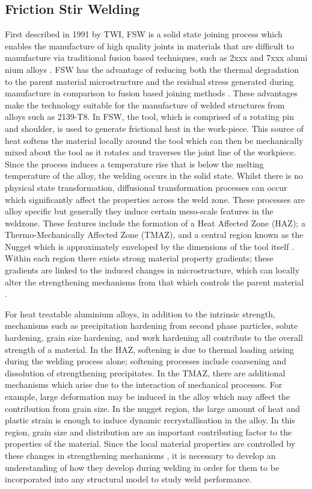 \subsection{Friction Stir Welding}
\label{IntroFSW}
First described in 1991 by TWI, FSW is a solid state joining process which enables the manufacture of high quality joints in materials that are difficult to manufacture via traditional fusion based techniques, such as 2xxx and 7xxx alumi nium alloys \cite{Karlsson2000,Peel2003}.  FSW has the advantage of reducing both the thermal degradation to the parent material microstructure and the residual stress generated during manufacture in comparison to fusion based joining methods \cite{Mishra2005}. These advantages make the technology suitable for the manufacture of welded structures from alloys such as 2139-T8. 
In FSW, the tool, which is comprised of a rotating pin and shoulder, is used to generate frictional heat in the work-piece. This source of heat softens the material locally around the tool which can then be mechanically mixed about the tool as it rotates and traverses the joint line of the workpiece. Since the process induces a temperature rise that is below the melting temperature of the alloy, the welding occurs in the solid state. 
Whilst there is no physical state transformation, diffusional transformation processes can occur which significantly affect the properties across the weld zone. These processes are alloy specific but generally they induce certain meso-scale features in the weldzone. These features include the formation of a Heat Affected Zone (HAZ); a Thermo-Mechanically Affected Zone (TMAZ), and a central region known as the Nugget which is approximately enveloped by the dimensions of the tool itself \cite{Mishra2005}. Within each region there exists strong material property gradients; these gradients are linked to the induced changes in microstructure, which can locally alter the strengthening mechanisms from that which controls the parent material \cite{Su2003,Mahoney1998}. 

For heat treatable aluminium alloys, in addition to the intrinsic strength, mechanisms such as precipitation hardening from second phase particles, solute hardening, grain size hardening, and work hardening all contribute to the overall strength of a material. In the HAZ, softening is due to thermal loading arising during the welding process alone; softening processes include coarsening and dissolution of strengthening precipitates. In the TMAZ, there are additional mechanisms which arise due to the interaction of mechanical processes. For example, large deformation may be induced in the alloy which may affect the contribution from grain size. In the nugget region, the large amount of heat and plastic strain is enough to induce dynamic recrystallisation in the alloy. In this region, grain size and distribution are an important contributing factor to the properties of the material. Since the local material properties are controlled by these changes in strengthening mechanisms \cite{Karlsson2000}, it is necessary to develop an understanding of how they develop during welding in order for them to be incorporated into any structural model to study weld performance.

